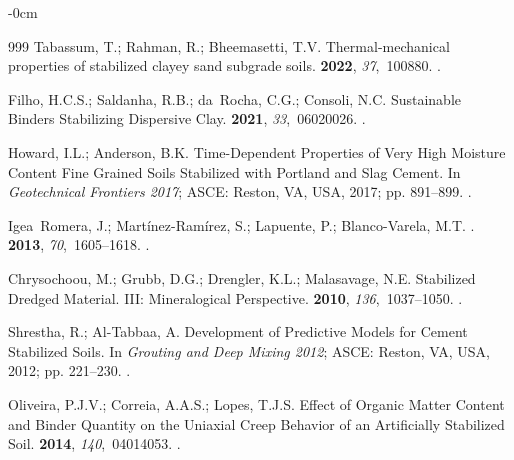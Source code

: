 \documentclass[sustainability,article,accept,pdftex,moreauthors]{Definitions/mdpi}
\begin{document}
{{\begin{adjustwidth}{-\extralength}{0cm}
\begin{thebibliography}{999}
Tabassum, T.; Rahman, R.; Bheemasetti, T.V.
\newblock Thermal-mechanical properties of stabilized clayey sand subgrade
  soils.
 {\bf 2022}, {\em 37},~100880.
.

Filho, H.C.S.; Saldanha, R.B.; da~Rocha, C.G.; Consoli, N.C.
\newblock Sustainable Binders Stabilizing Dispersive Clay.
 {\bf 2021}, {\em
  33},~06020026.
.

Howard, I.L.; Anderson, B.K. Time-Dependent Properties of Very High Moisture
  Content Fine Grained Soils Stabilized with Portland and Slag Cement.
\newblock In {\em Geotechnical Frontiers 2017}; ASCE: Reston, VA, USA, 2017; pp. 891--899.
.

Igea~Romera, J.; Martínez-Ramírez, S.; Lapuente, P.; Blanco-Varela, M.T.
.
 {\bf 2013}, {\em 70},~1605--1618.
.

Chrysochoou, M.; Grubb, D.G.; Drengler, K.L.; Malasavage, N.E.
\newblock Stabilized Dredged Material. III: Mineralogical Perspective.\linebreak 
{} {\bf
  2010}, {\em 136},~1037--1050.
.

Shrestha, R.; Al-Tabbaa, A. Development of Predictive Models for Cement
  Stabilized Soils.
\newblock In {\em Grouting and Deep Mixing 2012}; ASCE: Reston, VA, USA, 2012; pp. 221--230.
.

Oliveira, P.J.V.; Correia, A.A.S.; Lopes, T.J.S.
\newblock Effect of Organic Matter Content and Binder Quantity on the Uniaxial
  Creep Behavior of an Artificially Stabilized Soil.
 {\bf
  2014}, {\em 140},~04014053.
.


\end{thebibliography}
\end{adjustwidth}}}
\end{document}
